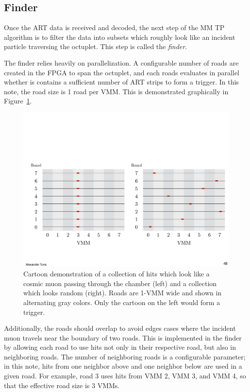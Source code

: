 \subsection{Finder}
\label{sec:alg-finder}

Once the ART data is received and decoded, the next step of the MM TP algorithm is to filter the data into subsets which roughly look like an incident particle traversing the octuplet. This step is called the \textit{finder}.

The finder relies heavily on parallelization. A configurable number of roads are created in the FPGA to span the octuplet, and each roads evaluates in parallel whether is contains a sufficient number of ART strips to form a trigger. In this note, the road size is 1 road per VMM. This is demonstrated graphically in Figure~\ref{fig:cartoon_road_demo}.

\begin{figure}[!htpb]
  \begin{center}
    \includegraphics[width=1.0\textwidth]{figures/cartoons/cartoon_road_demo}
  \end{center}
  \vspace{-20pt}
  \caption{Cartoon demonstration of a collection of hits which look like a cosmic muon passing through the chamber (left) and a collection which looks random (right). Roads are 1-VMM wide and shown in alternating gray colors. Only the cartoon on the left would form a trigger.}
  \label{fig:cartoon_road_demo}
\end{figure}

Additionally, the roads should overlap to avoid edges cases where the incident muon travels near the boundary of two roads. This is implemented in the finder by allowing each road to use hits not only in their respective road, but also in neighboring roads. The number of neighboring roads is a configurable parameter; in this note, hits from one neighbor above and one neighbor below are used in a given road. For example, road 3 uses hits from VMM 2, VMM 3, and VMM 4, so that the effective road size is 3 VMMs.

